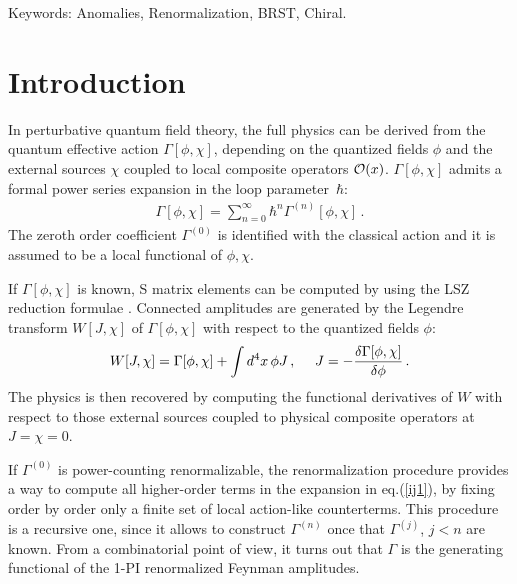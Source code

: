 \documentclass[a4paper,11pt]{article}
\def\G{\Gamma}
\begin{document}
Keywords: Anomalies, Renormalization, BRST, Chiral. 
%
%
\vfill\eject
\section{Introduction}

In perturbative quantum field theory, the full physics can be derived from
the quantum effective action $\G[\phi,\chi]$,
depending on the quantized fields $\phi$ 
and the external sources $\chi$ coupled to local composite operators
${\cal O}(x)$.
$\G[\phi,\chi]$  admits a formal power series expansion in the loop 
parameter~$\hbar$:
%
\begin{eqnarray}
\G[\phi,\chi] = \sum_{n=0}^{\infty} \hbar^n \G^{(n)}[\phi,\chi] \, .
\label{ij1}
\end{eqnarray}
%
The zeroth order coefficient $\G^{(0)}$ is identified with the
classical action and it is assumed to be a local functional of
$\phi,\chi$. 

If $\G[\phi,\chi]$ is known, S matrix elements can be computed
by using the LSZ reduction formulae \cite{itzk}. Connected amplitudes are
generated by the Legendre transform $W[J,\chi]$ of $\G[\phi,\chi]$ with respect
to the quantized fields $\phi$:
%
\begin{eqnarray}
W[J,\chi] = \G[\phi,\chi] + \int d^4x \, \phi J \, , ~~~~
J = - {\delta \G[\phi,\chi] \over \delta \phi} \, .
\label{ij1bis}
\end{eqnarray}
%
The physics is then recovered by computing the functional derivatives of $W$ with respect to those external sources coupled to physical
composite operators 
at $J=\chi=0$.


If $\G^{(0)}$ is power-counting renormalizable,
the renormalization procedure \cite{velo}
provides a way to compute all 
higher-order terms in the expansion in eq.(\ref{ij1}),
by fixing order by order only a finite set of local action-like 
counterterms.
This procedure is a recursive one, since  it 
allows to construct $\G^{(n)}$ once that 
$\G^{(j)}$, $j <n$ are known. 
From a combinatorial point of view, it turns out that $\G$ is the generating
functional of the 1-PI renormalized Feynman amplitudes.
\end{document}
